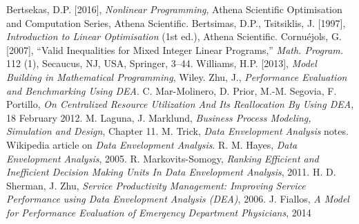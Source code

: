 
\begin{thebibliography}{99}
 Bertsekas, D.P. [2016], \textit{Nonlinear Programming}, Athena Scientific
Optimisation and Computation Series, Athena Scientific.
 Bertsimas, D.P.,  Tsitsiklis, J. [1997],  \textit{Introduction to
Linear Optimisation} (1st ed.), Athena Scientific.
 Cornu\'ejols, G. [2007], ``Valid Inequalities for Mixed Integer Linear
Programs,'' \textit{Math. Program.} 112 (1), Secaucus, NJ, USA, 
Springer, 3--44.
 Williams, H.P. [2013], \textit{Model Building in Mathematical Programming}, Wiley.
 Zhu, J., \textit{Performance Evaluation and Benchmarking Using DEA}. 
 C. Mar-Molinero, D. Prior, M.-M. Segovia, F. Portillo, \textit{On Centralized Resource Utilization And Its Reallocation By Using DEA}, 18 February 2012.  
 M. Laguna, J. Marklund, \textit{Business Process Modeling, Simulation and Design}, Chapter  11. 
 M. Trick, \textit{Data Envelopment Analysis} notes.  
 Wikipedia article on \textit{Data Envelopment Analysis}. 
 R. M. Hayes, \textit{Data Envelopment Analysis}, 2005. 
 R. Markovits-Somogy, \textit{Ranking Efficient and Inefficient Decision Making Units In Data Envelopment Analysis}, 2011. 
 H. D. Sherman, J. Zhu, \textit{Service Productivity Management: Improving Service Performance using Data Envelopment Analysis (DEA)}, 2006. 
 J. Fiallos, \textit{A Model for Performance Evaluation of Emergency Department Physicians}, 2014 

\end{thebibliography}

